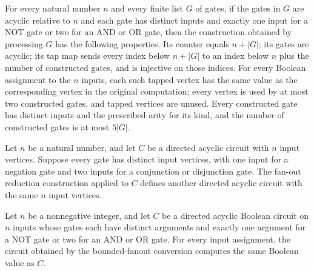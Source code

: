 \begin{theorem}
\label{BoolCircuit.nnGates_inv}
\leanok
{}
For every natural number $n$ and every finite list $G$ of gates, if the gates in $G$ are
acyclic relative to $n$ and each gate has distinct inputs and exactly one input for a
NOT gate or two for an AND or OR gate, then the construction obtained by processing $G$
has the following properties. Its counter equals $n+|G|$; its gates are acyclic; its tap
map sends every index below $n+|G|$ to an index below $n$ plus the number of constructed
gates, and is injective on those indices. For every Boolean assignment to the $n$
inputs, each such tapped vertex has the same value as the corresponding vertex in the
original computation; every vertex is used by at most two constructed gates, and tapped
vertices are unused. Every constructed gate has distinct inputs and the prescribed arity
for its kind, and the number of constructed gates is at most $5|G|$.
\end{theorem}

\begin{definition}
\label{BoolCircuit.DAGCircuit.fanoutTwoNN}
\leanok
{}
Let $n$ be a natural number, and let $C$ be a directed acyclic circuit with $n$ input
vertices. Suppose every gate has distinct input vertices, with one input for a negation
gate and two inputs for a conjunction or disjunction gate. The fan-out reduction
construction applied to $C$ defines another directed acyclic circuit with the same $n$
input vertices.
\end{definition}

\begin{theorem}
\label{BoolCircuit.DAGCircuit.fanoutTwoNN_eval}
\leanok
{}
Let $n$ be a nonnegative integer, and let $C$ be a directed acyclic Boolean circuit on
$n$ inputs whose gates each have distinct arguments and exactly one argument for a NOT
gate or two for an AND or OR gate. For every input assignment, the circuit obtained by
the bounded-fanout conversion computes the same Boolean value as $C$.
\end{theorem}

